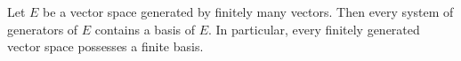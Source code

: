 Let $E$ be a vector space generated by finitely many vectors. Then every system of generators of $E$ contains a basis of $E$. In particular, every finitely generated vector space possesses a finite basis.
